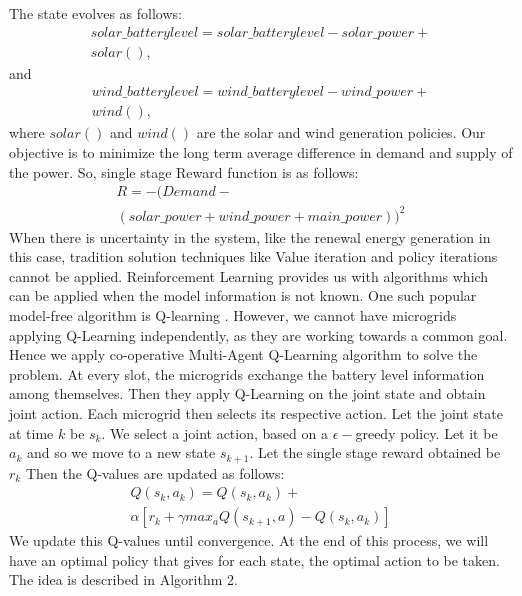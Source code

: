 \documentclass[conference]{IEEEtran}
\begin{document}
The state evolves as follows:
\begin{equation}
\begin{split}
solar\_batterylevel = solar\_batterylevel - solar\_power + \\ solar(), 
\end{split}
\end{equation}
and
\begin{equation}
\begin{split}
wind\_batterylevel = wind\_batterylevel - wind\_power + \\ wind(),
\end{split}
\end{equation}
where
$solar()$ and $wind()$ are the solar and wind generation policies. 
Our objective is to minimize the long term average difference in demand and supply of the power. So, single stage Reward function is as follows:
\begin{equation}
\begin{split}
R = -(Demand - \\
(solar\_power+wind\_power+main\_power))^2
\end{split}
\end{equation}
When there is uncertainty in the system, like the renewal energy generation in this case, tradition solution techniques like Value iteration and policy iterations cannot be applied. Reinforcement Learning provides us with algorithms which can be applied when the model information is not known. One such popular model-free algorithm is Q-learning \cite{vol2}. However, we cannot have microgrids applying Q-Learning independently, as they are working towards a common goal. Hence we apply co-operative Multi-Agent Q-Learning algorithm \cite{marl} to solve the problem. At every slot, the microgrids exchange the battery level information among themselves. Then they apply Q-Learning on the joint state and obtain joint action. Each microgrid then selects its respective action. Let the joint state at time $k$ be $s_{k}$. We select a joint action, based on a $\epsilon-$greedy policy. Let it be $a_{k}$ and so we move to a new state $s_{k+1}$. Let the single stage reward obtained be $r_{k}$ Then the Q-values are updated as follows:
\begin{equation}\label{Q-val}
\begin{split}
Q(s_{k},a_{k}) = Q(s_{k},a_{k}) + \\
 \alpha[r_{k}+\gamma max_{a}Q(s_{k+1},a) - Q(s_{k},a_{k})] 
\end{split}
\end{equation}
We update this Q-values until convergence. At the end of this process, we will have an optimal policy that gives for each state, the optimal action to be taken. The idea is described in  Algorithm 2. 
\end{document}
